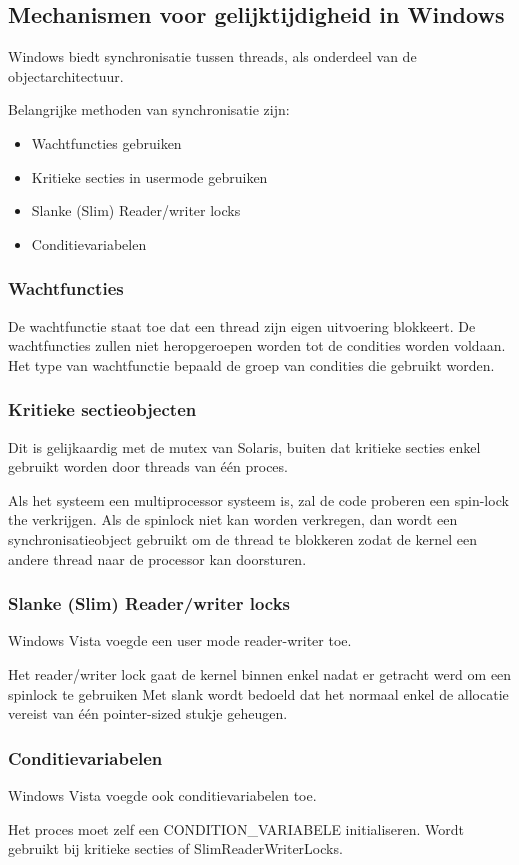 \subsection{Mechanismen voor gelijktijdigheid in Windows}

Windows biedt synchronisatie tussen threads, als onderdeel van de objectarchitectuur. 

Belangrijke methoden van synchronisatie zijn:


\begin{itemize}
\item Wachtfuncties gebruiken
\item Kritieke secties in usermode gebruiken
\item Slanke (Slim) Reader/writer locks
\item Conditievariabelen
\end{itemize}


\subsubsection{Wachtfuncties}

De wachtfunctie staat toe dat een thread zijn eigen uitvoering blokkeert. De wachtfuncties zullen niet heropgeroepen worden tot de condities worden voldaan. Het type van wachtfunctie bepaald de groep van condities die gebruikt worden.

\subsubsection{Kritieke sectieobjecten}

Dit is gelijkaardig met de mutex van Solaris, buiten dat kritieke secties enkel gebruikt worden door threads van één proces.

Als het systeem een multiprocessor systeem is, zal de code proberen een spin-lock the verkrijgen. Als de spinlock niet kan worden verkregen, dan wordt een synchronisatieobject gebruikt om de thread te blokkeren zodat de kernel een andere thread naar de processor kan doorsturen.


\subsubsection{Slanke (Slim) Reader/writer locks}

Windows Vista voegde een user mode reader-writer toe.

Het reader/writer lock gaat de kernel binnen enkel nadat er getracht werd om een spinlock te gebruiken Met slank wordt bedoeld dat het normaal enkel de allocatie vereist van één pointer-sized stukje geheugen.


\subsubsection{Conditievariabelen}

Windows Vista voegde ook conditievariabelen toe.

Het proces moet zelf een CONDITION\_VARIABELE initialiseren. Wordt gebruikt bij kritieke secties of SlimReaderWriterLocks.
